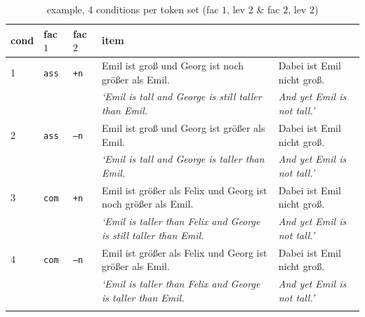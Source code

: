 \documentclass[output=paper,
modfonts
]{langscibook}
\begin{document}
\begin{table}
\begin{tabular}{lll|ll}
\lsptoprule
cond & fac $1$ & fac $2$ & item & \\
\midrule
1 & \texttt{ass} & \texttt{\footnotesize{+}n} & Emil ist groß \hspace{25pt} und Georg ist noch größer als Emil. & Dabei ist Emil nicht groß. \\
 & & & \textit{`Emil is tall \hspace{32pt} and George is \hspace{0.4pt} still \hspace{2pt} taller than Emil.} & \textit{And yet Emil is not tall.'} \\
\midrule
2 & \texttt{ass} & \texttt{\footnotesize{--}n} & Emil ist groß \hspace{25pt} und Georg ist \hspace{16pt} größer als Emil. & Dabei ist Emil nicht groß. \\
 & & & \textit{`Emil is tall \hspace{32pt} and George is \hspace{19pt} taller than Emil.} & \textit{And yet Emil is not tall.'}   \\
\midrule 
3 & \texttt{com} & \texttt{\footnotesize{+}n} & Emil ist größer als Felix \hspace{0.65pt} und Georg ist noch größer als Emil. & Dabei ist Emil nicht groß.   \\
 & & & \textit{`Emil is taller than Felix \hspace{2pt} and George is \hspace{0.4pt} still \hspace{2pt} taller than Emil.} & \textit{And yet Emil is not tall.'}  \\
\midrule
4 & \texttt{com} & \texttt{\footnotesize{--}n} & Emil ist größer als Felix \hspace{0.65pt} und Georg ist \hspace{16pt} größer als Emil. & Dabei ist Emil nicht groß.   \\
 & & & \textit{`Emil is taller than Felix \hspace{2pt} and George is \hspace{19pt} taller than Emil.} & \textit{And yet Emil is not tall.'}   \\
\lspbottomrule
\end{tabular}
\caption{example, 4 conditions  per token set (fac $1$, lev $2$ \& fac $2$, lev $2$)}
\label{tab:emil_example}
\end{table}
\end{document}
